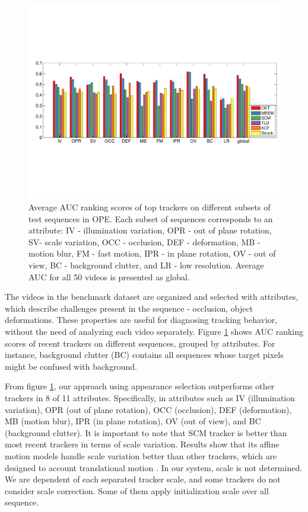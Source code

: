 \begin{figure}[h!]
\centering
\includegraphics[width=1.0\linewidth, trim= 0.2cm 6.15cm 0.2cm 5.8cm, clip=true]{Figures/bar_graph.pdf}
\caption[Average AUC ranking scores of top trackers on different subsets of test
sequences in OPE]
{\small Average AUC ranking scores of top trackers on different subsets of test
		sequences in OPE. Each subset of sequences corresponds to an attribute:
		IV - illumination variation, OPR - out of plane rotation, SV- scale
		variation, OCC - occlusion, DEF - deformation, MB - motion blur, FM -
		fast motion, IPR - in plane rotation, OV - out of view, BC - background
		clutter, and LR - low resolution. Average AUC for all 50 videos is
		presented as global.}
\label{fig:attributes}
\end{figure}

The videos in the benchmark dataset are organized and selected with attributes,
which describe challenges present in the sequence - \eg occlusion, object
deformations. These properties are useful for diagnosing tracking behavior,
without the need of analyzing each video separately. Figure \ref{fig:attributes}
shows AUC ranking scores of recent trackers on different sequences, grouped by
attributes. For instance, background clutter (BC) contains all sequences whose
target pixels might be confused with background.

From figure \ref{fig:attributes}, our approach using appearance selection
outperforms other trackers in 8 of 11 attributes. Specifically, in attributes
such as IV (illumination variation), OPR (out of plane rotation), OCC
(occlusion), DEF (deformation), MB (motion blur), IPR (in plane rotation),
OV (out of view), and BC (background clutter). It is important to note that SCM
tracker is better than most recent trackers in terms of scale variation.
Results show that its affine motion models handle scale
variation better than other trackers, which are designed to account
translational motion \cite{Zhong2012}. In our system, scale is not determined. We
are dependent of each separated tracker scale, and some trackers do not consider
scale correction. Some of them apply initialization scale over all sequence.



